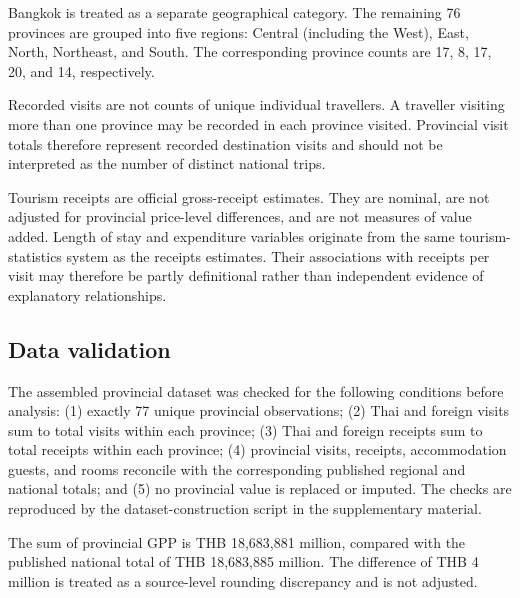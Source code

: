 \documentclass[11pt,a4paper]{article}
\theoremstyle{plain}\newtheorem{proposition}{Proposition}
\theoremstyle{definition}\newtheorem{definition}{Definition}
\begin{document}
Bangkok is treated as a separate geographical category. The remaining 76 provinces are grouped into five regions: Central (including the West), East, North, Northeast, and South. The corresponding province counts are 17, 8, 17, 20, and 14, respectively.

Recorded visits are not counts of unique individual travellers. A traveller visiting more than one province may be recorded in each province visited. Provincial visit totals therefore represent recorded destination visits and should not be interpreted as the number of distinct national trips.

Tourism receipts are official gross-receipt estimates. They are nominal, are not adjusted for provincial price-level differences, and are not measures of value added. Length of stay and expenditure variables originate from the same tourism-statistics system as the receipts estimates. Their associations with receipts per visit may therefore be partly definitional rather than independent evidence of explanatory relationships.

\subsection{Data validation}
The assembled provincial dataset was checked for the following conditions before analysis: (1) exactly 77 unique provincial observations; (2) Thai and foreign visits sum to total visits within each province; (3) Thai and foreign receipts sum to total receipts within each province; (4) provincial visits, receipts, accommodation guests, and rooms reconcile with the corresponding published regional and national totals; and (5) no provincial value is replaced or imputed. The checks are reproduced by the dataset-construction script in the supplementary material.

The sum of provincial GPP is THB 18,683,881 million, compared with the published national total of THB 18,683,885 million. The difference of THB 4 million is treated as a source-level rounding discrepancy and is not adjusted.
\end{document}
